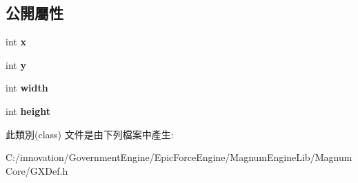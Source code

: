 \subsection*{公開屬性}
\begin{DoxyCompactItemize}
\item 
int {\bfseries x}\hypertarget{class_i_dream_sky_1_1_g_x_image_rect_a42b94af9b76ef39e5b974076a7257726}{}\label{class_i_dream_sky_1_1_g_x_image_rect_a42b94af9b76ef39e5b974076a7257726}

\item 
int {\bfseries y}\hypertarget{class_i_dream_sky_1_1_g_x_image_rect_a96905ca3292a6ebaa02cb3dd60d9d4a3}{}\label{class_i_dream_sky_1_1_g_x_image_rect_a96905ca3292a6ebaa02cb3dd60d9d4a3}

\item 
int {\bfseries width}\hypertarget{class_i_dream_sky_1_1_g_x_image_rect_a0a79630f836bc59c7558df3e8f12833d}{}\label{class_i_dream_sky_1_1_g_x_image_rect_a0a79630f836bc59c7558df3e8f12833d}

\item 
int {\bfseries height}\hypertarget{class_i_dream_sky_1_1_g_x_image_rect_a6e77645656dfef2da399318e682bcb66}{}\label{class_i_dream_sky_1_1_g_x_image_rect_a6e77645656dfef2da399318e682bcb66}

\end{DoxyCompactItemize}


此類別(class) 文件是由下列檔案中產生\+:\begin{DoxyCompactItemize}
\item 
C\+:/innovation/\+Government\+Engine/\+Epic\+Force\+Engine/\+Magnum\+Engine\+Lib/\+Magnum\+Core/G\+X\+Def.\+h\end{DoxyCompactItemize}
